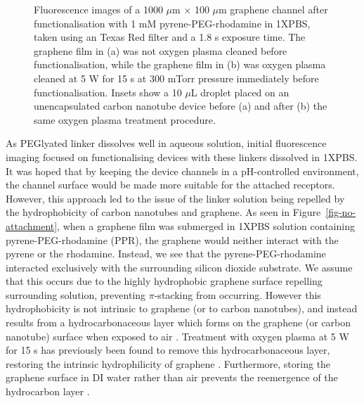 \documentclass[
  a4paper,
]{scrbook}
\begin{document}
\begin{figure}
\begin{minipage}[t]{0.47\linewidth}
{{}

}

\subcaption{\label{fig-attachment-post-plasma}}
\end{minipage}%

\caption{\label{fig-hydrophobicity}Fluorescence images of a 1000
\(\mu\)m \(\times\) 100 \(\mu\)m graphene channel after
functionalisation with 1 mM pyrene-PEG-rhodamine in 1XPBS, taken using
an Texas Red filter and a 1.8 s exposure time. The graphene film in (a)
was not oxygen plasma cleaned before functionalisation, while the
graphene film in (b) was oxygen plasma cleaned at 5 W for 15 s at 300
mTorr pressure immediately before functionalisation. Insets show a 10
\(\mu\)L droplet placed on an unencapsulated carbon nanotube device
before (a) and after (b) the same oxygen plasma treatment procedure.}

\end{figure}

As PEGlyated linker dissolves well in aqueous solution, initial
fluorescence imaging focused on functionalising devices with these
linkers dissolved in 1XPBS. It was hoped that by keeping the device
channels in a pH-controlled environment, the channel surface would be
made more suitable for the attached receptors. However, this approach
led to the issue of the linker solution being repelled by the
hydrophobicity of carbon nanotubes and graphene. As seen in
Figure~\ref{fig-no-attachment}, when a graphene film was submerged in
1XPBS solution containing pyrene-PEG-rhodamine (PPR), the graphene would
neither interact with the pyrene or the rhodamine. Instead, we see that
the pyrene-PEG-rhodamine interacted exclusively with the surrounding
silicon dioxide substrate. We assume that this occurs due to the highly
hydrophobic graphene surface repelling surrounding solution, preventing
\(\pi\)-stacking from occurring. However this hydrophobicity is not
intrinsic to graphene (or to carbon nanotubes), and instead results from
a hydrocarbonaceous layer which forms on the graphene (or carbon
nanotube) surface when exposed to air \autocite{Ashraf2014,Stando2019}.
Treatment with oxygen plasma at 5 W for 15 s has previously been found
to remove this hydrocarbonaceous layer, restoring the intrinsic
hydrophilicity of graphene \autocite{Shin2010}. Furthermore, storing the
graphene surface in DI water rather than air prevents the reemergence of
the hydrocarbon layer \autocite{Ashraf2014}.
\end{document}
